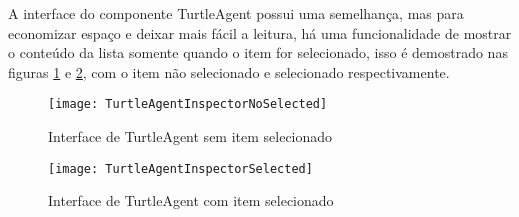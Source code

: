  A interface do componente TurtleAgent possui uma semelhança, mas para economizar espaço e deixar mais fácil a leitura, há uma funcionalidade de mostrar o conteúdo da lista somente quando o item for selecionado, isso é demostrado nas figuras \ref{TurtleAgentWithout} e \ref{TurtleAgentSelect}, com o item não selecionado e selecionado respectivamente.

\begin{figure}[!h]
	\centering
	\texttt{[image: TurtleAgentInspectorNoSelected]}
	\caption{Interface de TurtleAgent sem item selecionado}
	\label{TurtleAgentWithout}
\end{figure}

\begin{figure}[!h]
	\centering
	\texttt{[image: TurtleAgentInspectorSelected]}
	\caption{Interface de TurtleAgent com item selecionado}
	\label{TurtleAgentSelect}
\end{figure}